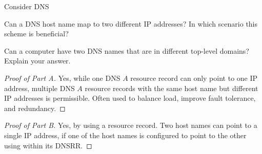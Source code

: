 \documentclass[../main.tex]{subfiles}
\begin{document}
\begin{wts}
    Consider DNS
    \begin{enumalpha}
        \item Can a DNS host name map to two different IP addresses? In which scenario this scheme is beneficial?
        \item Can a computer have two DNS names that are in different top-level domains? Explain your answer.
    \end{enumalpha}
\end{wts}
\begin{proof}[Proof of Part A]
    Yes, while one DNS $A$ resource record can only point to one IP address, multiple DNS $A$ resource records with the same host name but different IP addresses is permissible. Often used to balance load, improve fault tolerance, and redundancy.
\end{proof}
\begin{proof}[Proof of Part B]
    Yes, by using a  resource record. Two host names can point to a single IP address, if one of the host names is configured to point to the other using  within its DNSRR.
\end{proof}
\end{document}
